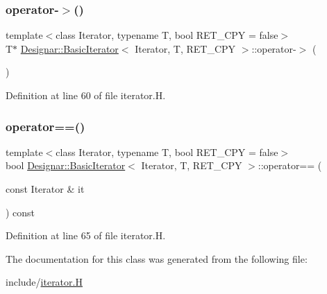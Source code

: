 \subsubsection{\texorpdfstring{operator-\/$>$()}{operator->()}}
{\footnotesize\ttfamily template$<$class Iterator, typename T, bool R\+E\+T\+\_\+\+C\+PY = false$>$ \\
T$\ast$ \hyperlink{class_designar_1_1_basic_iterator}{Designar\+::\+Basic\+Iterator}$<$ Iterator, T, R\+E\+T\+\_\+\+C\+PY $>$\+::operator-\/$>$ (\begin{DoxyParamCaption}{ }\end{DoxyParamCaption})\hspace{0.3cm}{\ttfamily [inline]}}



Definition at line 60 of file iterator.\+H.

\mbox{\label{class_designar_1_1_basic_iterator_abaca601c4d1d4ff27429426437abbf02}} 
\subsubsection{\texorpdfstring{operator==()}{operator==()}}
{\footnotesize\ttfamily template$<$class Iterator, typename T, bool R\+E\+T\+\_\+\+C\+PY = false$>$ \\
bool \hyperlink{class_designar_1_1_basic_iterator}{Designar\+::\+Basic\+Iterator}$<$ Iterator, T, R\+E\+T\+\_\+\+C\+PY $>$\+::operator== (\begin{DoxyParamCaption}\item[{const Iterator \&}]{it }\end{DoxyParamCaption}) const\hspace{0.3cm}{\ttfamily [inline]}}



Definition at line 65 of file iterator.\+H.



The documentation for this class was generated from the following file\+:\begin{DoxyCompactItemize}
\item 
include/\hyperlink{iterator_8_h}{iterator.\+H}\end{DoxyCompactItemize}
